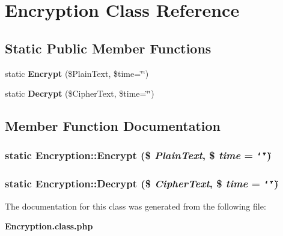 \section{Encryption Class Reference}
\label{classEncryption}
\subsection*{Static Public Member Functions}
\begin{CompactItemize}
\item 
static {\bf Encrypt} (\$PlainText, \$time=\char`\"{}\char`\"{})
\item 
static {\bf Decrypt} (\$CipherText, \$time=\char`\"{}\char`\"{})
\end{CompactItemize}


\subsection{Member Function Documentation}
\subsubsection{\setlength{\rightskip}{0pt plus 5cm}static Encryption::Encrypt (\$ {\em PlainText}, \$ {\em time} = {\tt \char`\"{}\char`\"{}})\hspace{0.3cm}{\tt  [static]}}\label{classEncryption_1ce35bf64f4f8028ccf7b3da5c280efa}


\subsubsection{\setlength{\rightskip}{0pt plus 5cm}static Encryption::Decrypt (\$ {\em CipherText}, \$ {\em time} = {\tt \char`\"{}\char`\"{}})\hspace{0.3cm}{\tt  [static]}}\label{classEncryption_900b73129a624bd885b85f70bb739784}




The documentation for this class was generated from the following file:\begin{CompactItemize}
\item 
{\bf Encryption.class.php}\end{CompactItemize}
